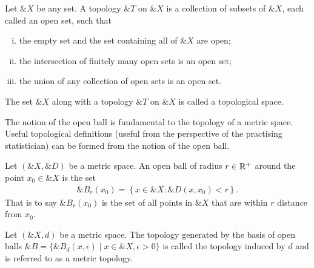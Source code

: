 
\begin{definition}%
  \label{def:topology1}
  Let $\&X$ be any set. A \textnormal{\sffamily topology} $\&T$ on $\&X$ is a
  collection of subsets of $\&X$, each called an open set, such that
  \begin{enumerate}[(i)]
  \item the empty set and the set containing all of $\&X$ are open;
  \item the intersection of finitely many open sets is an open set;
  \item the union of any collection of open sets is an open set.
  \end{enumerate} The set $\&X$ along with a topology $\&T$ on $\&X$
  is called a \textnormal{\sffamily topological space}.
\end{definition}

The notion of the open ball is fundamental to the topology of a metric
space.  Useful topological definitions (useful from the perspective of
the practising statistician) can be formed from the notion of the open
ball.

\begin{definition}%
  \label{def:open-ball}
  Let $(\&X, \&D)$ be a metric space. An \textnormal{\sffamily open
    ball} of radius $r \in \mathbb{R}^+$ around the point $x_0 \in \&X$ is the
  set
  \begin{align}
    \&B_r(x_0) = \left\{ x \in \&X : \&D(x,x_0) < r \right\}.
  \end{align}
  That is to say $\&B_r(x_0)$ is the set of all points in $\&X$ that
  are within $r$ distance from $x_0$.
\end{definition}

\begin{definition}%
  \label{def:topology2}
  Let $(\&X, d)$ be a metric space.  The topology generated by the
  basis of open balls
  $\&B = \{\&B_d(x, \epsilon) \mid x \in \&X, \epsilon > 0\}$ is
  called the \textnormal{\sffamily topology induced by} $d$ and is
  referred to as a \textnormal{\sffamily metric topology}.
\end{definition}


